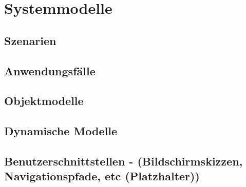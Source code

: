 \section{Systemmodelle}


\subsection{Szenarien}


\subsection{Anwendungsfälle}

\subsection{Objektmodelle}

\subsection{Dynamische Modelle}

\subsection{Benutzerschnittstellen - (Bildschirmskizzen, Navigationspfade, etc (Platzhalter))}